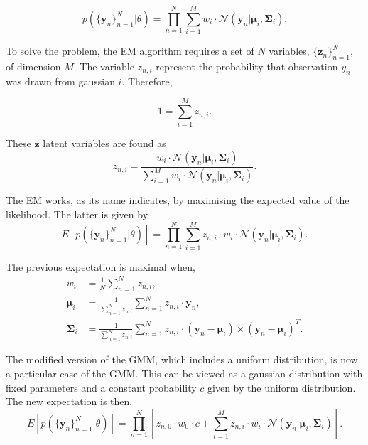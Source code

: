 \begin{equation}
p(\{\mathbf{y}_n\}_{n=1}^N|\theta)=\prod_{n=1}^N {\sum_{i=1} ^M {w_i\cdot \mathcal{N}(\mathbf{y}_n|\boldsymbol{\mu}_i,\boldsymbol{\Sigma}_i)}}.
\end{equation}

To solve the problem, the EM algorithm requires  a set of $N$ variables, $\{\boldsymbol{z}_n\}_{n=1}^N$, of dimension $M$. The variable $z_{n,i}$ represent the probability that observation $y_n$ was drawn from gaussian $i$. Therefore,

\begin{equation}
1=\sum_{i=1}^M z_{n,i}.
\end{equation}

These $\boldsymbol{z}$ latent variables are found as
\begin{equation}
z_{n,i}= \frac{w_i\cdot \mathcal{N}(\mathbf{y}_n|\boldsymbol{\mu}_i,\boldsymbol{\Sigma}_i)}{\sum_{i=1}^M w_i\cdot \mathcal{N}(\mathbf{y}_n|\boldsymbol{\mu}_i,\boldsymbol{\Sigma}_i)}.
\end{equation}

The EM works, as its name indicates, by maximising the expected value of the likelihood. The latter is given by
\begin{equation}
E[p(\{\mathbf{y}_n\}_{n=1}^N|\theta)]=\prod_{n=1}^N {\sum_{i=1} ^M {z_{n,i}\cdot w_i\cdot \mathcal{N}(\mathbf{y}_n|\boldsymbol{\mu}_i,\boldsymbol{\Sigma}_i)}}.
\end{equation}

The previous expectation is maximal when,
\begin{align}
w_i &= \frac{1}{N} \sum_{n=1}^N z_{n,i}, \\
\boldsymbol{\mu}_i &= \frac{1}{\sum_{n=1}^N z_{n,i}} \sum_{n=1}^N z_{n,i}\cdot \mathbf{y}_n,\\
\boldsymbol{\Sigma}_i &= \frac{1}{\sum_{n=1}^N z_{n,i}} \sum_{n=1}^N z_{n,i}\cdot (\mathbf{y}_n - \boldsymbol{\mu}_i)\times(\mathbf{y}_n-\boldsymbol{\mu}_i)^T.
\end{align}

The modified version of the GMM, which includes a uniform distribution, is now a particular case of the GMM. This can be viewed as a gaussian distribution with fixed parameters and a constant probability $c$ given by the uniform distribution. The new expectation is then,
\begin{equation}
E[p(\{\mathbf{y}_n\}_{n=1}^N|\theta)]=\prod_{n=1}^N {\left[z_{n,0}\cdot w_0 \cdot c + \sum_{i=1} ^M {z_{n,i}\cdot w_i\cdot \mathcal{N}(\mathbf{y}_n|\boldsymbol{\mu}_i,\boldsymbol{\Sigma}_i)}\right]}.
\end{equation}

